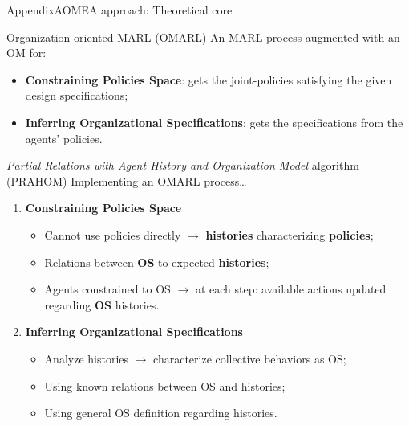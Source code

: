 \begin{frame}{Appendix}{AOMEA approach: Theoretical core}

    \begin{block}{Organization-oriented MARL (OMARL)}
        An MARL process augmented with an OM for:
        \begin{itemize}
            \item \textbf{Constraining Policies Space}: gets the joint-policies satisfying the given design specifications;
            \item \textbf{Inferring Organizational Specifications}: gets the specifications from the agents' policies.
        \end{itemize}

    \end{block}

    \begin{block}{\emph{Partial Relations with Agent History and Organization Model} algorithm (PRAHOM)}
        Implementing an OMARL process\dots
        \begin{enumerate}
            \item \textbf{Constraining Policies Space}
                  \begin{itemize}
                      \item Cannot use policies directly $\rightarrow$ \textbf{histories} characterizing \textbf{policies};
                      \item Relations between \textbf{OS} to expected \textbf{histories};
                      \item Agents constrained to OS $\rightarrow$ at each step: available actions updated regarding \textbf{OS} histories.
                  \end{itemize}

            \item \textbf{Inferring Organizational Specifications}
                  \begin{itemize}
                      \item Analyze histories $\rightarrow$ characterize collective behaviors as OS;
                      \item Using known relations between OS and histories;
                      \item Using general OS definition regarding histories.
                  \end{itemize}
        \end{enumerate}
    \end{block}
\end{frame}

